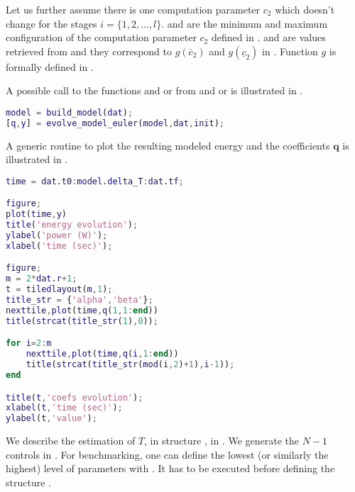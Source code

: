 Let us further assume there is one computation parameter $c_2$ which doesn't change for the stages $i=\{1,2,\dots,l\}$.  and  are the minimum and maximum configuration of the computation parameter $c_2$ defined in .  and  are values retrieved from \powprof{} and they correspond to $g(\overline{c}_2)$ and $g(\underline{c}_2)$ in . Function $g$ is formally defined in .

A possible call to the functions  and  or  from  and  or  is illustrated in .

\begin{lstlisting}[language=Matlab,caption={[Example to build and evolve the model]An example to build a differential model and evolve it over a horizon $N$.},captionpos=b,label=lst:call_model]
model = build_model(dat);
[q,y] = evolve_model_euler(model,dat,init);
\end{lstlisting}

A generic routine to plot the resulting modeled energy and the coefficients $\mathbf{q}$ is illustrated in .

\begin{lstlisting}[language=Matlab,caption={[Plot of the modeled energy and coefficients]A generic polotting routine for them modeled energy evultion and coefficients evolution.},captionpos=b,label=lst:model_plot]
time = dat.t0:model.delta_T:dat.tf;

figure;
plot(time,y)
title('energy evolution');
ylabel('power (W)');
xlabel('time (sec)');

figure;
m = 2*dat.r+1;
t = tiledlayout(m,1);
title_str = {'alpha','beta'};
nexttile,plot(time,q(1,1:end))
title(strcat(title_str(1),0));

for i=2:m
    nexttile,plot(time,q(i,1:end))
    title(strcat(title_str(mod(i,2)+1),i-1));
end

title(t,'coefs evolution');
xlabel(t,'time (sec)');
ylabel(t,'value');
\end{lstlisting}

We describe the estimation of $T$,  in structure , in . We generate the $N-1$ controls in . For benchmarking, one can define the lowest (or similarly the highest) level of parameters with . It has to be executed before defining the structure .

